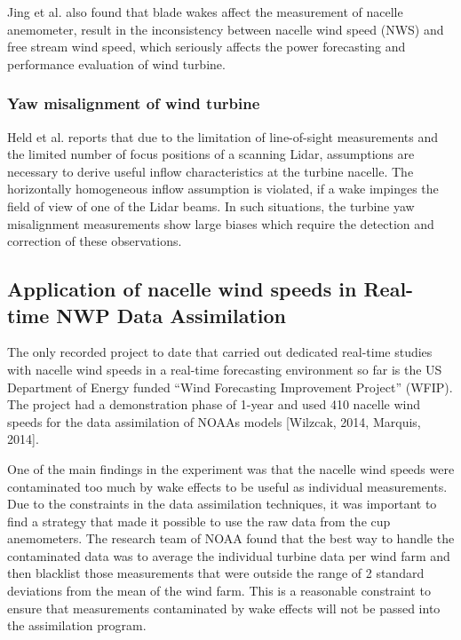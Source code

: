 Jing et al. \cite{Jing2020} also found that blade wakes affect the measurement of nacelle anemometer, result in the inconsistency between nacelle wind speed (NWS) and free stream wind speed, which seriously affects the power forecasting and performance evaluation of wind turbine.



\subsubsection{Yaw misalignment of wind turbine}

Held et al. \cite{Held2019} reports that due to the limitation of line-of-sight measurements and the limited number of focus positions of a scanning Lidar, assumptions are necessary to derive useful inflow characteristics at the turbine nacelle. The horizontally homogeneous inflow assumption is violated, if a wake impinges the field of view of one of the Lidar beams. In such situations, the turbine yaw misalignment measurements show large biases which require the detection and correction of these observations.



\subsection{Application of nacelle wind speeds in Real-time NWP Data Assimilation} \label{subsec:nacelle_wind_speeds_in_nwp_data_assimilation}

The only recorded project to date that carried out dedicated real-time studies with nacelle wind speeds in a real-time forecasting environment so far is the US Department of Energy funded “Wind Forecasting Improvement Project” (WFIP). The project had a demonstration phase of 1-year and used 410 nacelle wind speeds for the data assimilation of NOAAs models [Wilzcak, 2014, Marquis, 2014]. 

One of the main findings in the experiment was that the nacelle wind speeds were contaminated too much by wake effects to be useful as individual measurements. Due to the constraints in the data assimilation techniques, it was important to find a strategy that made it possible to use the raw data from the cup anemometers. The research team of NOAA found that the best way to handle the contaminated data was to average the individual turbine data per wind farm and then blacklist those measurements that were outside the range of 2 standard deviations from the mean of the wind farm. This is a reasonable constraint to ensure that measurements contaminated by wake effects will not be passed into the assimilation program. 


